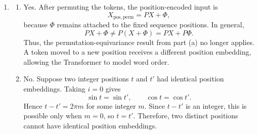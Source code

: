 \documentclass[11pt, a4paper, oneside]{article}
\begin{document}
\begin{enumerate}[label=(\alph*), left=0pt, labelsep=1em, itemsep=1em]
\begin{enumerate}[label=\roman*., left=0pt, labelsep=1em, itemsep=1em]
        \item Although permutation equivariance is useful for unordered set
        inputs, it is problematic for text because word order carries
        syntactic and semantic information. Without positional information,
        permuting the input tokens merely permutes the output representations
        in the same way; after matching each output with its corresponding
        token, the representations are otherwise unchanged. Therefore, the
        Transformer cannot model order-dependent relationships, such as which
        noun is the subject and which is the object.
    \end{enumerate}

    \item
    \begin{enumerate}[label=\roman*., left=0pt, labelsep=1em, itemsep=1em]
        \item Yes. After permuting the tokens, the position-encoded input is
        \[
            X_{\mathrm{pos,perm}}=PX+\Phi,
        \]
        because $\Phi$ remains attached to the fixed sequence positions. In
        general,
        \[
            PX+\Phi\neq P(X+\Phi)=PX+P\Phi.
        \]
        Thus, the permutation-equivariance result from part (a) no longer
        applies. A token moved to a new position receives a different position
        embedding, allowing the Transformer to model word order.

        \item No. Suppose two integer positions $t$ and $t'$ had identical
        position embeddings. Taking $i=0$ gives
        \[
            \sin t=\sin t',
            \qquad
            \cos t=\cos t'.
        \]
        Hence $t-t'=2\pi m$ for some integer $m$. Since $t-t'$ is an integer,
        this is possible only when $m=0$, so $t=t'$. Therefore, two distinct
        positions cannot have identical position embeddings.
    \end{enumerate}
\end{enumerate}
\end{document}
